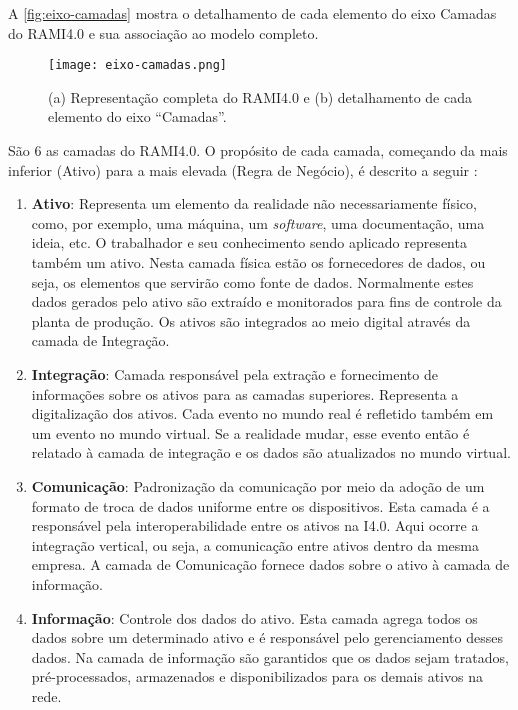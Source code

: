 A \autoref{fig:eixo-camadas} mostra o detalhamento de cada elemento do eixo Camadas do RAMI4.0 e sua associação ao modelo completo.

\begin{figure}[htb]
	\centering
	\texttt{[image: eixo-camadas.png]}
	\caption{(a) Representação completa do RAMI4.0 e (b) detalhamento de cada elemento do eixo ``Camadas''.}
	\label{fig:eixo-camadas}
\end{figure}

São 6 as camadas do RAMI4.0. O propósito de cada camada, começando da mais inferior (Ativo) para a mais elevada (Regra de Negócio), é descrito a seguir \cite{bitkom2016implementation}:

\begin{enumerate}
	\item \textbf{Ativo}: Representa um elemento da realidade não necessariamente físico, como, por exemplo, uma máquina, um \textit{software}, uma documentação, uma ideia, etc. O trabalhador e seu conhecimento sendo aplicado representa também um ativo. Nesta camada física estão os fornecedores de dados, ou seja, os elementos que servirão como fonte de dados. Normalmente estes dados gerados pelo ativo são extraído e monitorados para fins de controle da planta de produção. Os ativos são integrados ao meio digital através da camada de Integração.

	\item \textbf{Integração}: Camada responsável pela extração e fornecimento de informações sobre os ativos para as camadas superiores. Representa a digitalização dos ativos. Cada evento no mundo real é refletido também em um evento no mundo virtual. Se a realidade mudar, esse evento então é relatado à camada de integração e os dados são atualizados no mundo virtual.

	\item \textbf{Comunicação}: Padronização da comunicação por meio da adoção de um formato de troca de dados uniforme entre os dispositivos. Esta camada é a responsável pela interoperabilidade entre os ativos na I4.0. Aqui ocorre a integração vertical, ou seja, a comunicação entre ativos dentro da mesma empresa. A camada de Comunicação fornece dados sobre o ativo à camada de informação.

	\item \textbf{Informação}: Controle dos dados do ativo. Esta camada agrega todos os dados sobre um determinado ativo e é responsável pelo gerenciamento desses dados. Na camada de informação são garantidos que os dados sejam tratados, pré-processados, armazenados e disponibilizados para os demais ativos na rede.


\end{enumerate}
